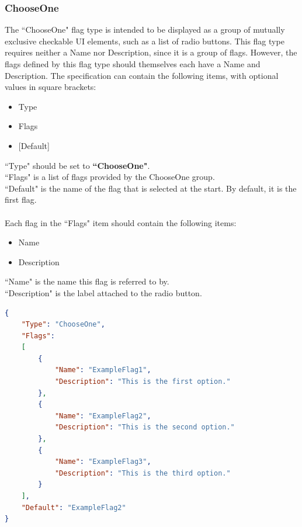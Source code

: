 \documentclass{article}
\begin{document}
\subsubsection{ChooseOne}
The ``ChooseOne" flag type is intended to be displayed as a group of mutually exclusive checkable UI elements, such as a list of radio buttons. This flag type requires neither a Name nor Description, since it is a group of flags. However, the flags defined by this flag type should themselves each have a Name and Description. The specification can contain the following items, with optional values in square brackets:
\begin{itemize}
\item Type
\item Flags
\item {[Default]}
\end{itemize}
``Type" should be set to \textbf{``ChooseOne"}.\\
``Flags" is a list of flags provided by the ChooseOne group.\\
``Default" is the name of the flag that is selected at the start. By default, it is the first flag.\\\\
Each flag in the ``Flags" item should contain the following items:
\begin{itemize}
\item Name
\item Description
\end{itemize}
``Name" is the name this flag is referred to by.\\
``Description" is the label attached to the radio button.\\

\begin{lstlisting}[language=json,firstnumber=1]
{
    "Type": "ChooseOne",
    "Flags":
    [
        {
            "Name": "ExampleFlag1",
            "Description": "This is the first option."
        },
        {
            "Name": "ExampleFlag2",
            "Description": "This is the second option."
        },
        {
            "Name": "ExampleFlag3",
            "Description": "This is the third option."
        }
    ],
    "Default": "ExampleFlag2"
}
\end{lstlisting}
\end{document}

